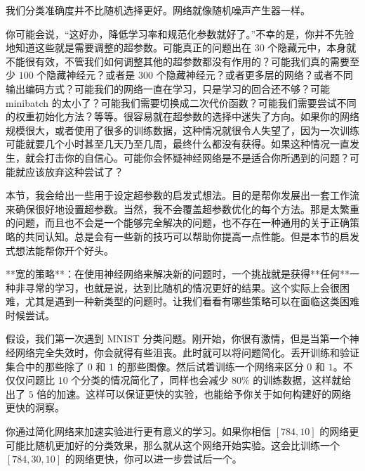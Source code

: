 我们分类准确度并不比随机选择更好。网络就像随机噪声产生器一样。

你可能会说，“这好办，降低学习率和规范化参数就好了。”不幸的是，你并不先验地知道这些就是需要调整的超参数。可能真正的问题出在 $30$ 个隐藏元中，本身就不能很有效，不管我们如何调整其他的超参数都没有作用的？可能我们真的需要至少 $100$ 个隐藏神经元？或者是 $300$ 个隐藏神经元？或者更多层的网络？或者不同输出编码方式？可能我们的网络一直在学习，只是学习的回合还不够？可能 minibatch 的太小了？可能我们需要切换成二次代价函数？可能我们需要尝试不同的权重初始化方法？等等。很容易就在超参数的选择中迷失了方向。如果你的网络规模很大，或者使用了很多的训练数据，这种情况就很令人失望了，因为一次训练可能就要几个小时甚至几天乃至几周，最终什么都没有获得。如果这种情况一直发生，就会打击你的自信心。可能你会怀疑神经网络是不是适合你所遇到的问题？可能就应该放弃这种尝试了？

本节，我会给出一些用于设定超参数的启发式想法。目的是帮你发展出一套工作流来确保很好地设置超参数。当然，我不会覆盖超参数优化的每个方法。那是太繁重的问题，而且也不会是一个能够完全解决的问题，也不存在一种通用的关于正确策略的共同认知。总是会有一些新的技巧可以帮助你提高一点性能。但是本节的启发式想法能帮你开个好头。

**宽的策略**：在使用神经网络来解决新的问题时，一个挑战就是获得**任何**一种非寻常的学习，也就是说，达到比随机的情况更好的结果。这个实际上会很困难，尤其是遇到一种新类型的问题时。让我们看看有哪些策略可以在面临这类困难时候尝试。

假设，我们第一次遇到 MNIST 分类问题。刚开始，你很有激情，但是当第一个神经网络完全失效时，你会就得有些沮丧。此时就可以将问题简化。丢开训练和验证集合中的那些除了 $0$ 和 $1$ 的那些图像。然后试着训练一个网络来区分 $0$ 和 $1$。不仅仅问题比 $10$ 个分类的情况简化了，同样也会减少 80\% 的训练数据，这样就给出了 $5$ 倍的加速。这样可以保证更快的实验，也能给予你关于如何构建好的网络更快的洞察。

你通过简化网络来加速实验进行更有意义的学习。如果你相信 $[784, 10]$ 的网络更可能比随机更加好的分类效果，那么就从这个网络开始实验。这会比训练一个 $[784, 30 ,10]$ 的网络更快，你可以进一步尝试后一个。

